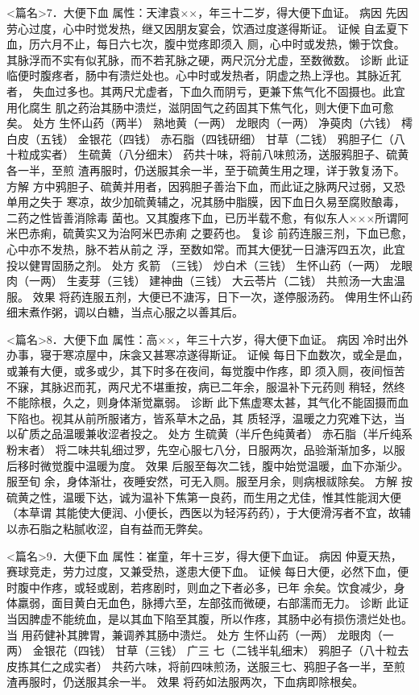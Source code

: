 \documentclass[a4paper,12pt,UTF8,twoside]{ctexbook}
\begin{document}
<篇名>7．大便下血
属性：天津袁××，年三十二岁，得大便下血证。 
病因 先因劳心过度，心中时觉发热，继又因朋友宴会，饮酒过度遂得斯证。 
证候 自孟夏下血，历六月不止，每日六七次，腹中觉疼即须入 
厕，心中时或发热，懒于饮食。其脉浮而不实有似芤脉，而不若芤脉之硬，两尺沉分尤虚，至数微数。 
诊断 此证临便时腹疼者，肠中有溃烂处也。心中时或发热者，阴虚之热上浮也。其脉近芤者， 
失血过多也。其两尺尤虚者，下血久而阴亏，更兼下焦气化不固摄也。此宜用化腐生 
肌之药治其肠中溃烂，滋阴固气之药固其下焦气化，则大便下血可愈矣。 
处方 生怀山药（两半） 熟地黄（一两） 龙眼肉（一两） 净萸肉（六钱） 
樗白皮（五钱） 金银花（四钱） 赤石脂（四钱研细） 甘草（二钱） 
鸦胆子仁（八十粒成实者） 生硫黄（八分细末） 
药共十味，将前八味煎汤，送服鸦胆子、硫黄各一半，至煎 
渣再服时，仍送服其余一半，至于硫黄生用之理，详于敦复汤下。 
方解 方中鸦胆子、硫黄并用者，因鸦胆子善治下血，而此证之脉两尺过弱，又恐单用之失于 
寒凉，故少加硫黄辅之，况其肠中脂膜，因下血日久易至腐败酿毒，二药之性皆善消除毒 
菌也。又其腹疼下血，已历半载不愈，有似东人×××所谓阿米巴赤痢，硫黄实又为治阿米巴赤痢 
之要药也。 
复诊 前药连服三剂，下血已愈，心中亦不发热，脉不若从前之 
浮，至数如常。而其大便犹一日溏泻四五次，此宜投以健胃固肠之剂。 
处方 炙箭 （三钱） 炒白术（三钱） 生怀山药（一两） 龙眼肉（一两） 
生麦芽（三钱） 建神曲（三钱） 大云苓片（二钱） 
共煎汤一大盅温服。 
效果 将药连服五剂，大便已不溏泻，日下一次，遂停服汤药。 
俾用生怀山药细末煮作粥，调以白糖，当点心服之以善其后。 


<篇名>8．大便下血
属性：高××，年三十六岁，得大便下血证。 
病因 冷时出外办事，寝于寒凉屋中，床衾又甚寒凉遂得斯证。 
证候 每日下血数次，或全是血，或兼有大便，或多或少，其下时多在夜间，每觉腹中作疼，即 
须入厕，夜间恒苦不寐，其脉迟而芤，两尺尤不堪重按，病已二年余，服温补下元药则 
稍轻，然终不能除根，久之，则身体渐觉羸弱。 
诊断 此下焦虚寒太甚，其气化不能固摄而血下陷也。视其从前所服诸方，皆系草木之品，其 
质轻浮，温暖之力究难下达，当以矿质之品温暖兼收涩者投之。 
处方 生硫黄（半斤色纯黄者） 赤石脂（半斤纯系粉末者） 
将二味共轧细过罗，先空心服七八分，日服两次，品验渐渐加多，以服后移时微觉腹中温暖为度。 
效果 后服至每次二钱，腹中始觉温暖，血下亦渐少。服至旬 
余，身体渐壮，夜睡安然，可无入厕。服至月余，则病根祓除矣。 
方解 按硫黄之性，温暖下达，诚为温补下焦第一良药，而生用之尤佳，惟其性能润大便（本草谓 
其能使大便润、小便长，西医以为轻泻药药），于大便滑泻者不宜，故辅以赤石脂之粘腻收涩，自有益而无弊矣。 


<篇名>9．大便下血
属性：崔童，年十三岁，得大便下血证。 
病因 仲夏天热，赛球竞走，劳力过度，又兼受热，遂患大便下血。 
证候 每日大便，必然下血，便时腹中作疼，或轻或剧，若疼剧时，则血之下者必多，已年 
余矣。饮食减少，身体羸弱，面目黄白无血色，脉搏六至，左部弦而微硬，右部濡而无力。 
诊断 此证当因脾虚不能统血，是以其血下陷至其腹，所以作疼，其肠中必有损伤溃烂处也。当 
用药健补其脾胃，兼调养其肠中溃烂。 
处方 生怀山药（一两） 龙眼肉（一两） 金银花（四钱） 甘草（三钱） 广三 
七（二钱半轧细末） 鸦胆子（八十粒去皮拣其仁之成实者） 
共药六味，将前四味煎汤，送服三七、鸦胆子各一半，至煎渣再服时，仍送服其余一半。 
效果 将药如法服两次，下血病即除根矣。 
\end{document}
